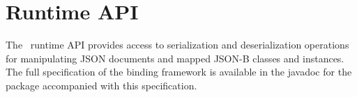 \chapter{Runtime API}
\label{runtime}

The \jsonb\ runtime API provides access to serialization and deserialization operations for manipulating JSON documents and mapped JSON-B classes and instances. The full specification of the binding framework is available in the javadoc for the  package accompanied with this specification.
